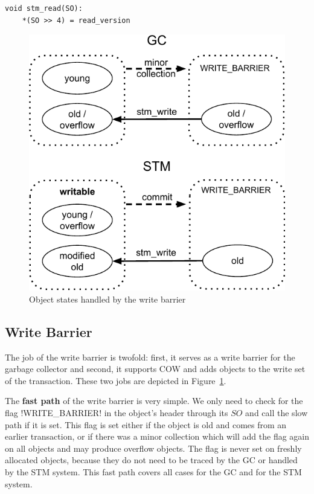 \documentclass{sigplanconf}
\makeatletter
\renewcommand\lstinline[1][]{%
  \Collectverb{\@@myverb}%
}
\def\@@myverb#1{%
    \begingroup
    \fboxsep=0.2em
    \colorbox{verylightgray}{\oldlstinline|#1|}%
    \endgroup
}
\makeatother
\begin{document}
\begin{lstlisting}
void stm_read(SO):
    *(SO >> 4) = read_version
\end{lstlisting}


\begin{figure}[h]
  \centering
  \includegraphics[width=0.8\columnwidth]{object_states.pdf}
  \caption{Object states handled by the write barrier\label{fig:obj_states}}
\end{figure}


\subsection{Write Barrier}

The job of the write barrier is twofold: first, it serves as a write
barrier for the garbage collector and second, it supports COW and adds
objects to the write set of the transaction. These two jobs are
depicted in Figure~\ref{fig:obj_states}.

The \textbf{fast path} of the write barrier is very simple. We only
need to check for the flag \lstinline!WRITE_BARRIER! in the object's
header through its $SO$ and call the slow path if it is set. This flag
is set either if the object is old and comes from an earlier
transaction, or if there was a minor collection which will add the
flag again on all objects and may produce overflow objects. The flag
is never set on freshly allocated objects, because they do not need
to be traced by the GC or handled by the STM system. This fast path
covers all cases for the GC and for the STM system.
\end{document}
